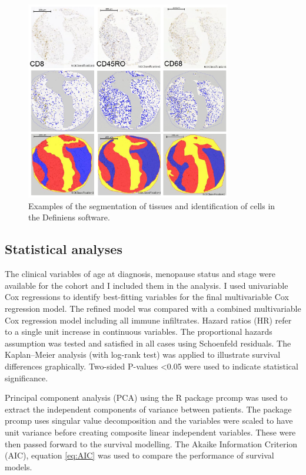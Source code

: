 \begin{figure}[htbp!] 
\centering    
\includegraphics[width=0.8\textwidth]{Chapter2/Figs/Raster/Segmentation.png}
\caption[Segmentation in Definiens]{Examples of the segmentation of tissues and identification of cells in the Definiens software.}
\label{fig:segmentation}
\end{figure}

\subsection{Statistical analyses}
 The clinical variables of age at diagnosis, menopause status and stage were available for the cohort and I included them in the analysis. I used univariable Cox regressions to identify best-fitting variables for the final multivariable Cox regression model. The refined model was compared with a combined multivariable Cox regression model including all immune infiltrates. Hazard ratios (HR) refer to a single unit increase in continuous variables. The proportional hazards assumption was tested and satisfied in all cases using Schoenfeld residuals. The Kaplan–Meier analysis (with log-rank test) was applied to illustrate survival differences graphically. Two-sided P-values <0.05 were used to indicate statistical significance. 

Principal component analysis (PCA) using the R package prcomp was used to extract the independent components of variance between patients. The package prcomp uses singular value decomposition and the variables were scaled to have unit variance before creating composite linear independent variables. These were then passed forward to the survival modelling. The Akaike Information Criterion (AIC), equation \ref{eq:AIC} was used to compare the performance of survival models.

